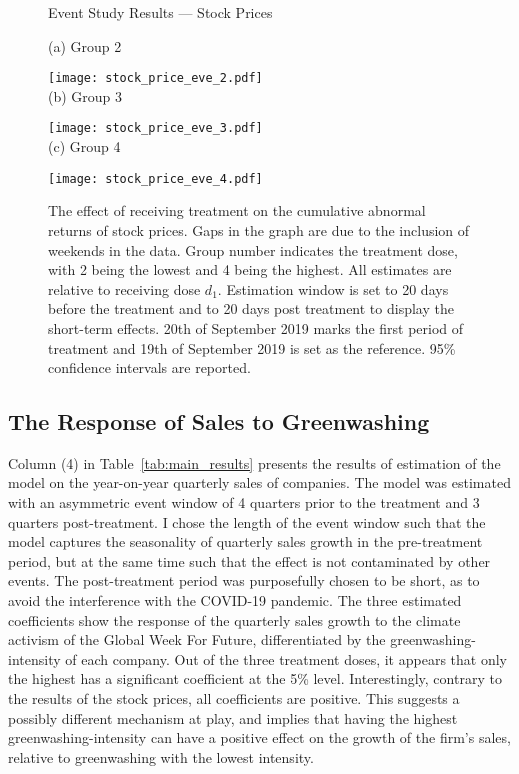 \documentclass[12pt]{article}
\begin{document}
\begin{figure}
    \caption{Event Study Results --- Stock Prices}\label{fig:eve_stock}
    \centering
    
    (a) Group 2
    
    \texttt{[image: stock\_price\_eve\_2.pdf]} \\
    
    (b) Group 3
    
    \texttt{[image: stock\_price\_eve\_3.pdf]} \\
    
    (c) Group 4
    
    \texttt{[image: stock\_price\_eve\_4.pdf]}
    
    \captionsetup{font=footnotesize}
    \caption*{The effect of receiving treatment on the cumulative abnormal returns of stock prices. Gaps in the graph are due to the inclusion of weekends in the data. Group number indicates the treatment dose, with 2 being the lowest and 4 being the highest. All estimates are relative to receiving dose $d_1$. Estimation window is set to 20 days before the treatment and to 20 days post treatment to display the short-term effects. 20th of September 2019 marks the first period of treatment and 19th of September 2019 is set as the reference. 95\% confidence intervals are reported.}
\end{figure}



\subsection{The Response of Sales to Greenwashing}

Column (4) in Table~\ref{tab:main_results} presents the results of estimation of the model on the year-on-year quarterly sales of companies. The model was estimated with an asymmetric event window of 4 quarters prior to the treatment and 3 quarters post-treatment. I chose the length of the event window such that the model captures the seasonality of quarterly sales growth in the pre-treatment period, but at the same time such that the effect is not contaminated by other events. The post-treatment period was purposefully chosen to be short, as to avoid the interference with the COVID-19 pandemic. The three estimated coefficients show the response of the quarterly sales growth to the climate activism of the Global Week For Future, differentiated by the greenwashing-intensity of each company. Out of the three treatment doses, it appears that only the highest has a significant coefficient at the 5\% level. Interestingly, contrary to the results of the stock prices, all coefficients are positive. This suggests a possibly different mechanism at play, and implies that having the highest greenwashing-intensity can have a positive effect on the growth of the firm's sales, relative to greenwashing with the lowest intensity.
\end{document}
